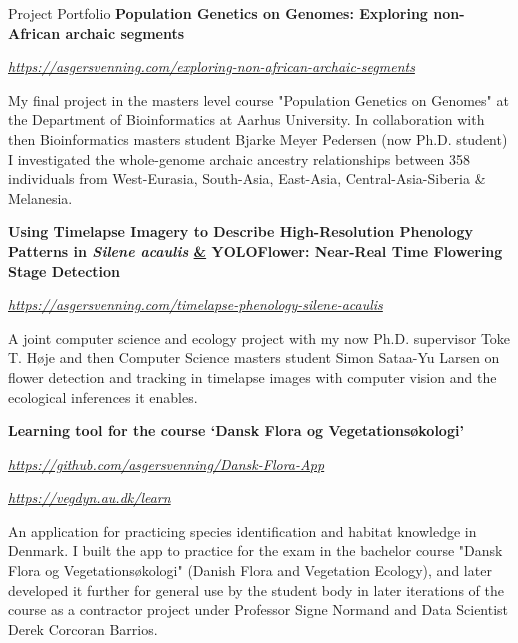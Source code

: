 \begin{rubric}{Project Portfolio}
%
    \textbf{Population Genetics on Genomes: Exploring non-African archaic segments}\par
    \href{https://asgersvenning.com/exploring-non-african-archaic-segments}{\color{blue}\textit{https://asgersvenning.com/exploring-non-african-archaic-segments}}\par
    \pind My final project in the masters level course "Population Genetics on Genomes" at the Department of Bioinformatics at Aarhus University. In collaboration with then Bioinformatics masters student Bjarke Meyer Pedersen (now Ph.D. student) I investigated the whole-genome archaic ancestry relationships between 358 individuals from West-Eurasia, South-Asia, East-Asia, Central-Asia-Siberia \& Melanesia.

%
    \textbf{Using Timelapse Imagery to Describe High-Resolution Phenology Patterns in \textit{Silene acaulis} \underline{\&} YOLOFlower: Near-Real Time Flowering Stage Detection}\par
    \href{https://asgersvenning.com/timelapse-phenology-silene-acaulis}{\color{blue}\textit{https://asgersvenning.com/timelapse-phenology-silene-acaulis}}\par
    \pind A joint computer science and ecology project with my now Ph.D. supervisor Toke T. Høje and then Computer Science masters student Simon Sataa-Yu Larsen on flower detection and tracking in timelapse images with computer vision and the ecological inferences it enables.

%
    \textbf{Learning tool for the course ‘Dansk Flora og Vegetationsøkologi’}\par
    \href{https://github.com/asgersvenning/Dansk-Flora-App}{\color{blue}\textit{https://github.com/asgersvenning/Dansk-Flora-App}}\par
    \href{https://vegdyn.au.dk/learn}{\color{SwishLineColour}\textit{https://vegdyn.au.dk/learn}}\par
    \pind An application for practicing species identification and habitat knowledge in Denmark. I built the app to practice for the exam in the bachelor course "Dansk Flora og Vegetationsøkologi" (Danish Flora and Vegetation Ecology), and later developed it further for general use by the student body in later iterations of the course as a contractor project under Professor Signe Normand and Data Scientist Derek Corcoran Barrios.


\end{rubric}